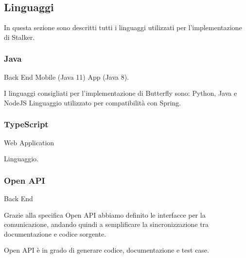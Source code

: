 \documentclass[../../../analisi-dei-requisiti.tex]{subfiles}
\begin{document}
\subsection{Linguaggi}%
\label{sub:linguaggi}
In questa sezione sono descritti tutti i linguaggi utilizzati per l'implementazione di Stalker.

\subsubsection{Java}%
\label{subs}
Back End Mobile (Java 11) App (Java 8).

I linguaggi consigliati per l'implementazione di Butterfly sono: Python, Java e NodeJS %
Linguaggio utilizzato per compatibilità con Spring.

\subsubsection{TypeScript}%
\label{subs:typescript}
Web Application

Linguaggio.

\subsubsection{Open API}%
\label{subs:open_api}
Back End

Grazie alla specifica Open API abbiamo definito le interfacce per la comunicazione, andando quindi a semplificare la sincronizzazione tra documentazione e codice sorgente.

Open API è in grado di generare codice, documentazione e test case.
\end{document}

